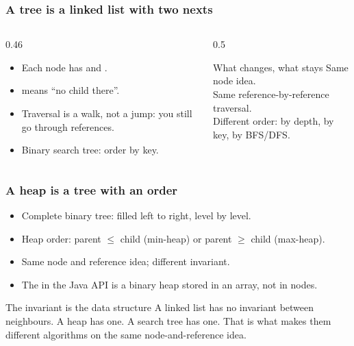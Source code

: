 \documentclass[aspectratio=169,10pt,compress]{beamer}
\begin{document}
\begin{frame}[t,fragile]\frametitle{A tree is a linked list with two nexts}
  \begin{columns}[T]
    \begin{column}{0.46\textwidth}
      \begin{itemize}\small
        \item Each node has  and .
        \item {} means ``no child there''.
        \item Traversal is a walk, not a jump: you still go through
              references.
        \item Binary search tree: order by key.
      \end{itemize}
    \end{column}
    \begin{column}{0.5\textwidth}
      \begin{block}{What changes, what stays}
        \small
        Same node idea.\\
        Same reference-by-reference traversal.\\
        Different order: by depth, by key, by BFS/DFS.
      \end{block}
    \end{column}
  \end{columns}
\end{frame}

\begin{frame}[t,fragile]\frametitle{A heap is a tree with an order}
  \begin{itemize}\small
    \item Complete binary tree: filled left to right, level by level.
    \item Heap order: parent $\le$ child (min-heap) or parent $\ge$ child (max-heap).
    \item Same node and reference idea; different invariant.
    \item The  in the Java API is a binary heap
          stored in an array, not in nodes.
  \end{itemize}
  \begin{block}{The invariant is the data structure}
    \small
    A linked list has no invariant between neighbours.
    A heap has one. A search tree has one. That is what makes them
    different algorithms on the same node-and-reference idea.
  \end{block}
\end{frame}
\end{document}
